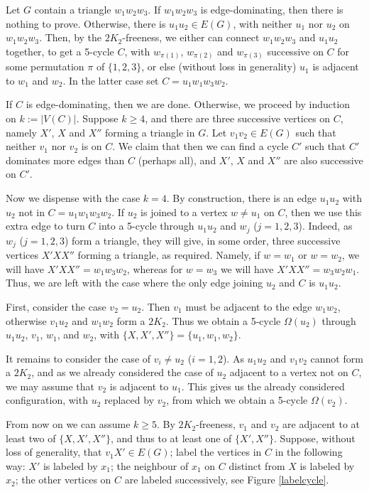 \documentclass{ws-jktr}
\begin{document}
Let $G$  contain a triangle $w_1w_2w_3$.  If $w_1w_2w_3$ is edge-dominating,
then there is nothing to prove. Otherwise, there is $u_1u_2\in
E(G)$, with neither $u_1$ nor $u_2$  on $w_1w_2w_3$.  Then, by the
$2K_2$-freeness, we either can connect $w_1w_2w_3$ and $u_1u_2$ together, to get a
5-cycle $C$, with $w_{\pi(1)}$, $w_{\pi(2)}$ and $w_{\pi(3)}$ successive on $C$
for some permutation $\pi$ of $\{1,2,3\}$, or else (without loss in generality)
$u_1$ is adjacent to $w_1$ and $w_2$. In the latter case set $C=u_1w_1w_3w_2$.

If $C$ is edge-dominating, then we are done. Otherwise, we proceed by induction on
$k:=|V(C)|$.
Suppose $k\ge 4$, and there are three successive vertices on $C$, namely $X'$, $X$ and $X''$ forming a triangle in $G$.
Let $v_1v_2\in E(G)$ such that neither $v_1$ nor $v_2$ is on $C$.
We claim that then we can find a cycle $C'$ such that $C'$ dominates more edges than $C$ (perhaps all),
and $X'$, $X$ and $X''$ are also successive on $C'$.

Now we dispense with the case $k=4$. By construction, there is an edge $u_1u_2$
with $u_2$ not in $C=u_1w_1w_3w_2$. If $u_2$ is joined to a vertex $w\neq u_1$ on $C$,
then we use this extra edge to turn $C$ into a 5-cycle through $u_1u_2$
and $w_j$ ($j=1,2,3$). Indeed, as $w_j$ ($j=1,2,3$) form a triangle, they will give,
in some order, three successive vertices $X'XX''$ forming a triangle, as required.
Namely, if $w=w_1$ or $w=w_2$, we will have $X'XX''=w_1w_3w_2$, whereas for $w=w_3$
we will have $X'XX''=w_3w_2w_1$.
Thus, we are left with the case where the only edge joining $u_2$ and $C$ is $u_1u_2$.

First, consider the case $v_2=u_2$. Then $v_1$ must be adjacent to the edge $w_1w_2$,
otherwise $v_1u_2$ and $w_1w_2$ form a $2K_2$. Thus we obtain a 5-cycle $\Omega(u_2)$
through $u_1u_2$, $v_1$, $w_1$, and $w_2$, with $\{X,X',X''\}=\{u_1,w_1,w_2\}$.

It remains to consider the case of $v_i\neq u_2$ ($i=1,2$).
As $u_1u_2$ and $v_1v_2$ cannot form a $2K_2$, and as we already considered
the case of $u_2$ adjacent to a vertex not on $C$, we may assume that
$v_2$ is adjacent to $u_1$. This gives us the already considered configuration,
with $u_2$ replaced by $v_2$, from which we obtain a 5-cycle $\Omega(v_2)$.

\medskip

From now on we can assume $k\geq 5$.
By $2K_2$-freeness, $v_1$ and $v_2$ are adjacent to at least two of $\{X,X',X''\}$,
and thus to at least one of $\{X',X''\}$.  Suppose,
without loss of generality, that $v_1X'\in E(G)$; label the vertices in $C$ in the following way:
$X'$ is labeled by $x_1$; the neighbour of $x_1$ on $C$ distinct from $X$ is labeled by $x_2$;
the other vertices on $C$ are labeled successively, see Figure \ref{labelcycle}.
\end{document}
